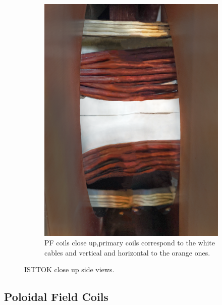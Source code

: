 \begin{figure}
\begin{subfigure}[b]{0.37\textwidth}
		\includegraphics[width=\textwidth]{Chp4/PFCoils.png}
	\caption{\label{ISTTOKpfCoils}PF coils close up,primary coils correspond to the  white cables and vertical and horizontal to the orange ones. }
\end{subfigure}

 \caption{ISTTOK close up side views. \label{ISTTOKviews} }
 
 
\end{figure}

\subsection{Poloidal Field Coils}

